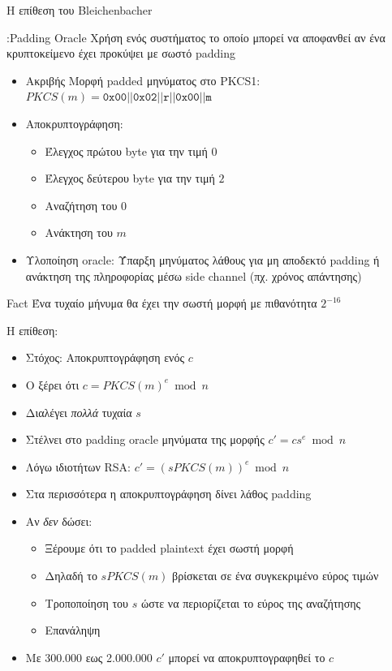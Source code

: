 \documentclass[handout]{beamer}
\begin{document}
\begin{frame}[allowframebreaks]{Η επίθεση του Bleichenbacher}

\begin{block}{:Padding Oracle}
Χρήση ενός συστήματος το οποίο μπορεί να αποφανθεί αν ένα κρυπτοκείμενο έχει προκύψει με σωστό padding
\end{block}

\begin{itemize}
\item Ακριβής Μορφή padded μηνύματος στο PKCS1: $PKCS(m)=\mathtt{0x00 || 0x02 || r || 0x00 || m}$
\item Αποκρυπτογράφηση: 
\begin{itemize}
\item Έλεγχος πρώτου byte για την τιμή $0$
\item Έλεγχος δεύτερου byte για την τιμή $2$
\item Αναζήτηση του $0$ 
\item Ανάκτηση του $m$
\end{itemize}
\item Υλοποίηση oracle: Ύπαρξη μηνύματος λάθους για μη αποδεκτό padding ή ανάκτηση της πληροφορίας μέσω side channel (πχ. χρόνος απάντησης)
\end{itemize}


\begin{block}{Fact}
Ένα τυχαίο μήνυμα θα έχει την σωστή μορφή με πιθανότητα $2^{-16}$
\end{block}

Η επίθεση:
\begin{itemize}
\item Στόχος: Αποκρυπτογράφηση ενός $c$ 
\item Ο \adv ξέρει ότι $c= PKCS(m)^e \bmod{n}$
\item Διαλέγει \emph{πολλά} τυχαία $s$
\item Στέλνει στο padding oracle μηνύματα της μορφής $ c'= c s^e \bmod{n}$ 
\item Λόγω ιδιοτήτων RSA: $c' = (s PKCS(m))^e \bmod{n}$
\item Στα περισσότερα η αποκρυπτογράφηση δίνει λάθος padding
\framebreak
\item Αν \emph{δεν} δώσει:
\begin{itemize} 
\item Ξέρουμε ότι το padded plaintext έχει σωστή μορφή
\item Δηλαδή το $sPKCS(m)$ βρίσκεται σε ένα συγκεκριμένο εύρος τιμών
\item Τροποποίηση του $s$ ώστε να περιορίζεται το εύρος της αναζήτησης
\item Επανάληψη
\end{itemize} 
\item Με 300.000 εως 2.000.000 $c'$ μπορεί να αποκρυπτογραφηθεί το $c$ 
\end{itemize}


\end{frame}
\end{document}
